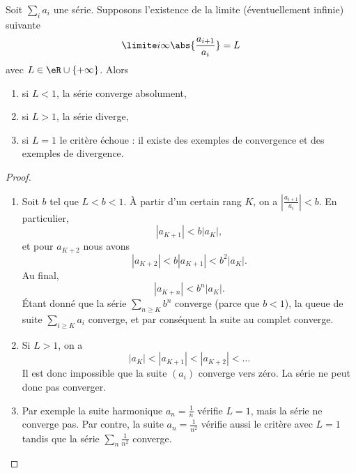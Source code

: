 \begin{proposition}     \label{PropOXKUooQmAaJX}
    Soit $\sum_i a_i$ une série. Supposons l'existence de la limite (éventuellement infinie) suivante
    \begin{equation}
      \limite i \infty \abs{\frac{a_{i+1}}{a_i}} = L
    \end{equation}
    avec \( L\in \eR\cup\{ +\infty \}\).  Alors
    \begin{enumerate}
    \item si $L < 1$, la série converge absolument,
    \item si $L > 1$, la série diverge,
    \item si $L = 1$ le critère échoue : il existe des exemples de convergence et des exemples de divergence.
    \end{enumerate}
\end{proposition}

\begin{proof}
\begin{enumerate}
    \item
        Soit $b$ tel que $L<b<1$. À partir d'un certain rang $K$, on a $\left| \frac{ a_{i+1} }{ a_i } \right| <b$. En particulier,
        \begin{equation}
            | a_{K+1} |<b| a_K |,
        \end{equation}
        et pour $a_{K+2}$ nous avons
        \begin{equation}
            | a_{K+2} |<b| a_{K+1} |<b^2| a_K |.
        \end{equation}
        Au final,
        \begin{equation}
            | a_{K+n} |<b^n| a_K |.
        \end{equation}
        Étant donné que la série $\sum_{n\geq K}b^n$ converge (parce que $b<1$), la queue de suite $\sum_{i\geq K}a_i$ converge, et par conséquent la suite au complet converge.
    \item
        Si $L>1$, on a
        \begin{equation}
            | a_K |<| a_{K+1} |<| a_{K+2} |<\ldots
        \end{equation}
        Il est donc impossible que la suite $(a_i)$ converge vers zéro. La série ne peut donc pas converger.
    \item
        Par exemple la suite harmonique $a_n=\frac{1}{ n }$ vérifie $L=1$, mais la série ne converge pas. Par contre, la suite $a_n=\frac{ 1 }{ n^2 }$ vérifie aussi le critère avec $L=1$ tandis que la série $\sum_n\frac{1}{ n^2 }$ converge.
\end{enumerate}
\end{proof}


